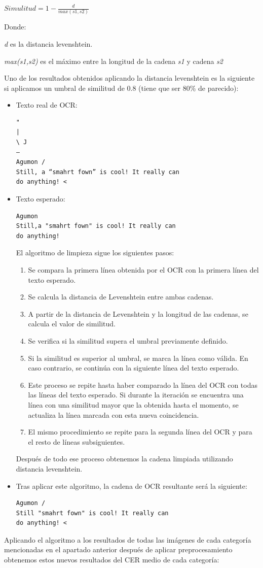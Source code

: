 $Simulitud = 1-\frac{d}{max(s1,s2)} $ 

Donde:

\textit{d} es la distancia levenshtein.

\textit{max(s1,s2)}	 es el máximo entre la longitud de la cadena \textit{s1} y cadena \textit{s2}

Uno de los resultados obtenidos aplicando la distancia levenshtein es la siguiente si aplicamos un umbral de similitud de 0.8 (tiene que ser 80\% de parecido):
\begin{itemize}
\item Texto real de OCR:
\begin{verbatim}
"
|
\ J
—
Agumon /
Still, a “smahrt fown” is cool! It really can
do anything! <
\end{verbatim}
\item Texto esperado:
\begin{verbatim}
Agumon
Still,a "smahrt fown" is cool! It really can
do anything!
\end{verbatim}

El algoritmo de limpieza sigue los siguientes pasos:

\begin{enumerate}
	\item Se compara la primera línea obtenida por el OCR con la primera línea del texto esperado.
	\item Se calcula la distancia de Levenshtein entre ambas cadenas.
	\item A partir de la distancia de Levenshtein y la longitud de las cadenas, se calcula el valor de similitud.
	\item Se verifica si la similitud supera el umbral previamente definido.
	\item Si la similitud es superior al umbral, se marca la línea como válida. En caso contrario, se continúa con la siguiente línea del texto esperado.
	\item Este proceso se repite hasta haber comparado la línea del OCR con todas las líneas del texto esperado. Si durante la iteración se encuentra una línea con una similitud mayor que la obtenida hasta el momento, se actualiza la línea marcada con esta nueva coincidencia.
	\item El mismo procedimiento se repite para la segunda línea del OCR y para el resto de líneas subsiguientes.
\end{enumerate}
Después de todo ese proceso obtenemos la cadena limpiada utilizando distancia levenshtein.
\item Tras aplicar este algoritmo, la cadena de OCR resultante será la siguiente:
\begin{verbatim}
Agumon /
Still "smahrt fown" is cool! It really can 
do anything! <
\end{verbatim}
\end{itemize}  
Aplicando el algoritmo a los resultados de todas las imágenes de cada categoría mencionadas en el apartado anterior después de aplicar preprocesamiento obtenemos estos nuevos resultados del CER medio de cada categoría:

